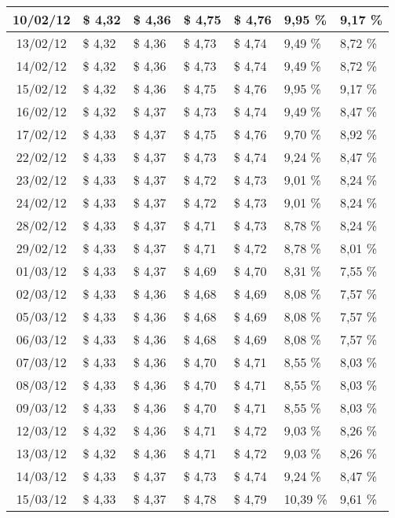 \begin{center}
\begin{longtable}{|c|p{1.5cm}|p{1.5cm}|p{1.5cm}|p{1.5cm}|p{1.5cm}|p{1.5cm}|}
10/02/12 & \$ 4,32 & \$ 4,36 & \$ 4,75 & \$ 4,76 & 9,95 \% & 9,17 \% \\ \hline
13/02/12 & \$ 4,32 & \$ 4,36 & \$ 4,73 & \$ 4,74 & 9,49 \% & 8,72 \% \\ \hline
14/02/12 & \$ 4,32 & \$ 4,36 & \$ 4,73 & \$ 4,74 & 9,49 \% & 8,72 \% \\ \hline
15/02/12 & \$ 4,32 & \$ 4,36 & \$ 4,75 & \$ 4,76 & 9,95 \% & 9,17 \% \\ \hline
16/02/12 & \$ 4,32 & \$ 4,37 & \$ 4,73 & \$ 4,74 & 9,49 \% & 8,47 \% \\ \hline
17/02/12 & \$ 4,33 & \$ 4,37 & \$ 4,75 & \$ 4,76 & 9,70 \% & 8,92 \% \\ \hline
22/02/12 & \$ 4,33 & \$ 4,37 & \$ 4,73 & \$ 4,74 & 9,24 \% & 8,47 \% \\ \hline
23/02/12 & \$ 4,33 & \$ 4,37 & \$ 4,72 & \$ 4,73 & 9,01 \% & 8,24 \% \\ \hline
24/02/12 & \$ 4,33 & \$ 4,37 & \$ 4,72 & \$ 4,73 & 9,01 \% & 8,24 \% \\ \hline
28/02/12 & \$ 4,33 & \$ 4,37 & \$ 4,71 & \$ 4,73 & 8,78 \% & 8,24 \% \\ \hline
29/02/12 & \$ 4,33 & \$ 4,37 & \$ 4,71 & \$ 4,72 & 8,78 \% & 8,01 \% \\ \hline
01/03/12 & \$ 4,33 & \$ 4,37 & \$ 4,69 & \$ 4,70 & 8,31 \% & 7,55 \% \\ \hline
02/03/12 & \$ 4,33 & \$ 4,36 & \$ 4,68 & \$ 4,69 & 8,08 \% & 7,57 \% \\ \hline
05/03/12 & \$ 4,33 & \$ 4,36 & \$ 4,68 & \$ 4,69 & 8,08 \% & 7,57 \% \\ \hline
06/03/12 & \$ 4,33 & \$ 4,36 & \$ 4,68 & \$ 4,69 & 8,08 \% & 7,57 \% \\ \hline
07/03/12 & \$ 4,33 & \$ 4,36 & \$ 4,70 & \$ 4,71 & 8,55 \% & 8,03 \% \\ \hline
08/03/12 & \$ 4,33 & \$ 4,36 & \$ 4,70 & \$ 4,71 & 8,55 \% & 8,03 \% \\ \hline
09/03/12 & \$ 4,33 & \$ 4,36 & \$ 4,70 & \$ 4,71 & 8,55 \% & 8,03 \% \\ \hline
12/03/12 & \$ 4,32 & \$ 4,36 & \$ 4,71 & \$ 4,72 & 9,03 \% & 8,26 \% \\ \hline
13/03/12 & \$ 4,32 & \$ 4,36 & \$ 4,71 & \$ 4,72 & 9,03 \% & 8,26 \% \\ \hline
14/03/12 & \$ 4,33 & \$ 4,37 & \$ 4,73 & \$ 4,74 & 9,24 \% & 8,47 \% \\ \hline
15/03/12 & \$ 4,33 & \$ 4,37 & \$ 4,78 & \$ 4,79 & 10,39 \% & 9,61 \% \\ \hline

\end{longtable}
\end{center}
